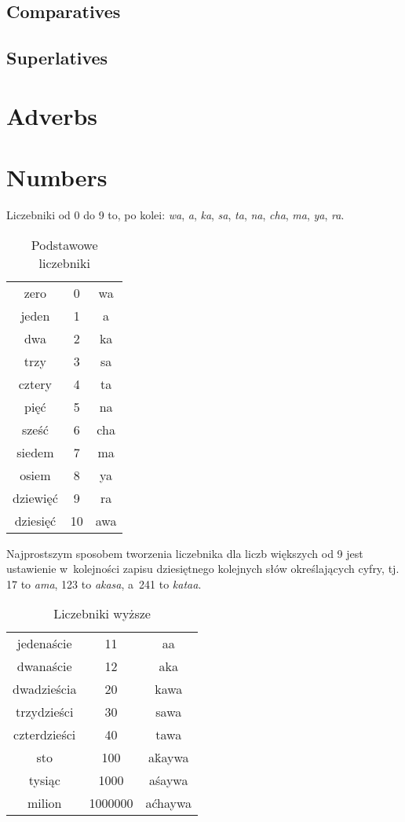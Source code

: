 \subsection{Comparatives}
\subsection{Superlatives}

\section{Adverbs}

\section{Numbers}

Liczebniki od 0 do 9 to, po kolei: \emph{wa}, \emph{a}, \emph{ka}, \emph{sa},
\emph{ta}, \emph{na}, \emph{cha}, \emph{ma}, \emph{ya}, \emph{ra}.

\begin{table}[ht]
  \centering
  \caption{Podstawowe liczebniki}
  \begin{tabular}{ccc} \toprule
    zero     & 0  & wa  \\
    jeden    & 1  & a   \\
    dwa      & 2  & ka  \\
    trzy     & 3  & sa  \\
    cztery   & 4  & ta  \\
    pięć     & 5  & na  \\
    sześć    & 6  & cha \\
    siedem   & 7  & ma  \\
    osiem    & 8  & ya  \\
    dziewięć & 9  & ra  \\
    dziesięć & 10 & awa \\\bottomrule
  \end{tabular}
  \label{tab:numerals}
\end{table}

Najprostszym sposobem tworzenia liczebnika dla liczb większych od 9 jest
ustawienie w~kolejności zapisu dziesiętnego kolejnych słów określających cyfry,
tj. 17 to \emph{ama}, 123 to \emph{akasa}, a~241 to \emph{kataa}.

\begin{table}[ht]
  \centering
  \caption{Liczebniki wyższe}
  \begin{tabular}{ccc} \toprule
    jedenaście   & 11      & aa      \\
    dwanaście    & 12      & aka     \\
    dwadzieścia  & 20      & kawa    \\
    trzydzieści  & 30      & sawa    \\
    czterdzieści & 40      & tawa    \\
    sto          & 100     & aḱaywa  \\
    tysiąc       & 1000    & aśaywa  \\
    milion       & 1000000 & aćhaywa \\\bottomrule
  \end{tabular}
  \label{tab:numerals2}
\end{table}

